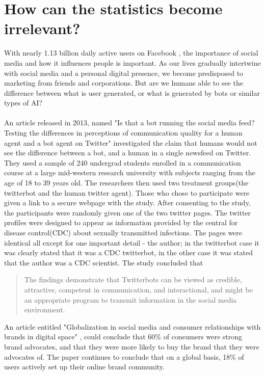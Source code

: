 \section{How can the statistics become irrelevant?}
With nearly 1.13 billion daily active users on Facebook \cite{FB:stats}, the importance of social media and how it influences people is important. As our lives gradually intertwine with social media and a personal digital presence, we become predisposed to marketing from friends and corporations.  But are we humans able to see the difference between what is user generated, or what is generated by bots or similar types of AI?
\\
\\
An article released in 2013, named "Is that a bot running the social media feed? Testing the differences in perceptions of communication quality for a human agent and a bot agent on Twitter"\cite{Edwards2014372} investigated the claim that humans would not see the difference between a bot, and a human in a single newsfeed on Twitter. They used a sample of 240 undergrad students enrolled in a communication course at a large mid-western research university with subjects ranging from the age of 18 to 39 years old. The researchers then used two treatment groups(the twitterbot and the human twitter agent). Those who chose to participate were given a link to a secure webpage with the study. After consenting to the study, the participants were randomly given one of the two twitter pages. The twitter profiles were designed to appear as information provided by the central for disease control(CDC) about sexually transmitted infections. The pages were identical all except for one important detail - the author; in the twitterbot case it was clearly stated that it was a CDC twitterbot, in the other case it was stated that the author was a CDC scientist. The study concluded that
 \begin{quote}
The findings demonstrate that Twitterbots can be viewed as credible, attractive,
competent in communication, and interactional, and might be an
appropriate program to transmit information in the social media
environment. 
\newline \mbox{} \hfill \citet{Edwards2014372}

\end{quote}
An article entitled "Globalization in social media and consumer relationships with brands in digital space" \cite{6959277120111201}, could conclude that 60\% of consumers\cite{6959277120111201} were strong brand advocates, and that they were more likely to buy the brand that they were advocates of. The paper continues to conclude that on a global basis, 18\% of users actively set up their online brand community\cite{6959277120111201}. 
\\
\\

